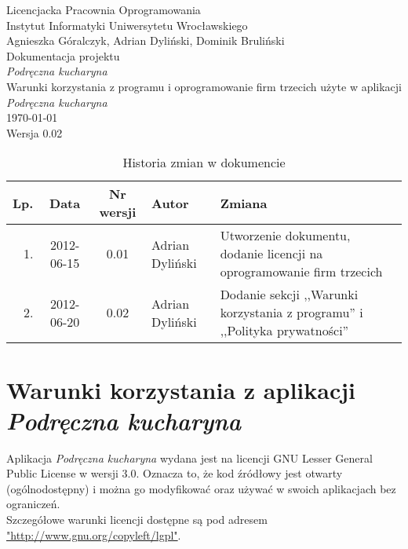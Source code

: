 \documentclass[12pt,leqno, twoside]{mwart}
\begin{document}
\thispagestyle{empty}
\begin{center}
Licencjacka Pracownia Oprogramowania \\ Instytut
Informatyki Uniwersytetu Wrocławskiego \\
\vspace{4cm}
\Large Agnieszka Góralczyk, Adrian Dyliński, Dominik Bruliński \\
\vspace{0.5cm}
\huge Dokumentacja projektu\\ \emph{Podręczna kucharyna}\\ \Large Warunki korzystania z programu i oprogramowanie firm trzecich użyte w aplikacji \emph{Podręczna kucharyna} \\
\vspace{1cm}
\normalsize \today \\
\vspace{2cm}
\normalsize Wersja 0.02
\end{center}

\newpage




\begin{table}
	\centering
	\caption{Historia zmian w dokumencie}
		\begin{tabular}{|r|c|c|l|l|}
		\hline
		Lp. & Data       & Nr wersji & Autor               & Zmiana \\ \hline
		1.   & 2012-06-15 & 0.01 & Adrian Dyliński& Utworzenie dokumentu, dodanie licencji na oprogramowanie firm trzecich\\ \hline
		2. & 2012-06-20 & 0.02 & Adrian Dyliński & Dodanie sekcji ,,Warunki korzystania z programu'' i ,,Polityka prywatności''\\ \hline
		\end{tabular}
\end{table}

\newpage

\tableofcontents
\newpage
\section{Warunki korzystania z aplikacji \emph{Podręczna kucharyna} }
Aplikacja \emph{Podręczna kucharyna} wydana jest na licencji GNU Lesser General Public License w wersji 3.0.
Oznacza to, że kod źródłowy jest otwarty (ogólnodostępny) i można go modyfikować oraz używać w swoich aplikacjach bez ograniczeń. \\
Szczegółowe warunki licencji dostępne są pod adresem \url{"http://www.gnu.org/copyleft/lgpl"}. \\
\end{document}

